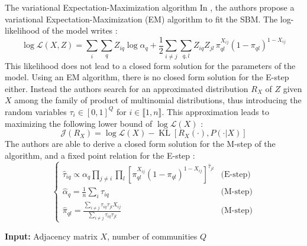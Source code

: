 \documentclass[final]{beamer}
\newlength{\colwidth}
\DeclareMathOperator*{\KL}{KL}
\begin{document}
\begin{frame}[t]
\begin{columns}[t]
\begin{column}{\colwidth}
      \begin{alertblock}{The variational Expectation-Maximization algorithm}
        In \cite{main_article}, the authors propose a variational Expectation-Maximization (EM) algorithm to fit the SBM. The log-likelihood of the model writes :
        \begin{equation}
          \log \mathcal{L}(X, Z) =  \sum_{i}\sum_{q} Z_{iq}\log\alpha_q + \frac{1}{2}\sum_{i\neq j}\sum_{q,l} Z_{iq}Z_{jl} \, \pi_{ql}^{X_{ij}}(1-\pi_{ql})^{1-X_{ij}}
        \end{equation}
        This likelihood does not lead to a closed form solution for the parameters of the model. Using an EM algorithm, there is no closed form solution for the E-step either. Instead the authors search for an approximated distribution $R_X$ of $Z$ given $X$ among the family of product of multinomial distributions, thus introducing the random variables $\tau_i\in [0,1]^Q$ for $i\in \llbracket 1,n \rrbracket$. This approximation leads to maximizing the following lower bound of $\log \mathcal{L}(X)$ :
        \begin{equation}
          \label{eq:lower_bound}
          \mathcal{J}(R_X)=\log \mathcal{L}(X)-\KL[R_X(\cdot), P(\cdot|X)]
        \end{equation}
        The authors are able to derive a closed form solution for the M-step of the algorithm, and a fixed point relation for the E-step :
        \begin{equation}
          \begin{cases}
            \hat{\tau}_{iq}\propto \alpha_q \prod_{j\neq i}\prod_l \left[\pi_{ql}^{X_{ij}}(1-\pi_{ql})^{1-X_{ij}}\right]^{\hat{\tau}_{jl}} & \text{(E-step)} \\
            \hat{\alpha}_q=\frac{1}{n}\sum_{i} \tau_{iq}                                                                                   & \text{(M-step)} \\
            \hat{\pi}_{ql}=\frac{\sum_{i\neq j} \tau_{iq}\tau_{jl}X_{ij}}{\sum_{i\neq j} \tau_{iq}\tau_{jl}}                               & \text{(M-step)}
          \end{cases}
        \end{equation}
        \centering
        \begin{minipage}{.9\linewidth}
          \begin{algorithm}[H]
            \caption{Variational Expectation-Maximization Algorithm}
            \begin{algorithmic}[1]
              \State \textbf{Input:} Adjacency matrix $X$, number of communities $Q$

\end{algorithmic}
\end{algorithm}
\end{minipage}
\end{alertblock}
\end{column}
\end{columns}
\end{frame}
\end{document}
